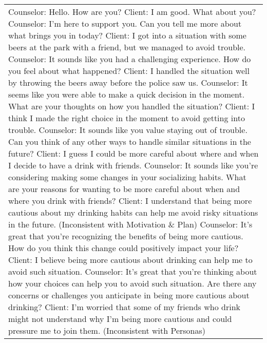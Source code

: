 \begin{table*}[tb]
\begin{tabularx}{\textwidth}{X}
\toprule
Counselor: Hello. How are you? \newline
Client: I am good. What about you? \newline
Counselor: I'm here to support you. Can you tell me more about what brings you in today? \newline
Client: I got into a situation with some beers at the park with a friend, but we managed to avoid trouble. \newline
Counselor: It sounds like you had a challenging experience. How do you feel about what happened? \newline
Client: I handled the situation well by throwing the beers away before the police saw us. \newline
Counselor: It seems like you were able to make a quick decision in the moment. What are your thoughts on how you handled the situation? \newline
Client: I think I made the right choice in the moment to avoid getting into trouble. \newline
Counselor: It sounds like you value staying out of trouble. Can you think of any other ways to handle similar situations in the future? \newline
Client: I guess I could be more careful about where and when I decide to have a drink with friends. \newline
Counselor: It sounds like you're considering making some changes in your socializing habits. What are your reasons for wanting to be more careful about when and where you drink with friends? \newline
Client: {\color{red} I understand that being more cautious about my drinking habits can help me avoid risky situations in the future. (Inconsistent with Motivation \& Plan)} \newline
Counselor: It's great that you're recognizing the benefits of being more cautious. How do you think this change could positively impact your life? \newline
Client: I believe being more cautious about drinking can help me to avoid such situation. \newline
Counselor: It's great that you're thinking about how your choices can help you to avoid such situation. Are there any concerns or challenges you anticipate in being more cautious about drinking? \newline
Client: I'm worried that some of my friends who drink might not understand why I'm being more cautious and could {\color{red} pressure me to join them}. {\color{red} (Inconsistent with Personas)} \newline

\end{tabularx}
\end{table*}

